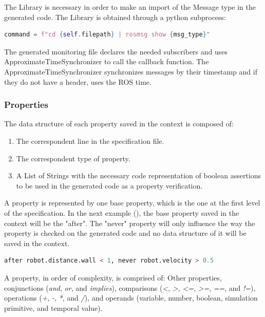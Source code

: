 The Library is necessary in order to make an import of the Message type in the generated code. The Library is obtained through a python subprocess:

\begin{lstlisting}[language=Python]
    command = f"cd {self.filepath} | rosmsg show {msg_type}"
\end{lstlisting}

The generated monitoring file declares the needed subscribers and uses ApproximateTimeSynchronizer to call the callback function. The ApproximateTimeSynchronizer synchronizes messages by their timestamp and if they do not have a header, uses the ROS time.


\subsubsection{Properties}
\label{sssec:compileProp}

The data structure of each property saved in the context is composed of:

\begin{enumerate}
    \item The correspondent line in the specification file.
    \item The correspondent type of property.
    \item A List of Strings with the necessary code representation of boolean assertions to be used in the generated code as a property verification.
\end{enumerate}


A property is represented by one base property, which is the one at the first level of the specification. In the next example (), the base property saved in the context will be the "after". The "never" property will only influence the way the property is checked on the generated code and no data structure of it will be saved in the context.

\begin{lstlisting}[language=Python]
    after robot.distance.wall < 1, never robot.velocity > 0.5
\end{lstlisting}\label{lstlisting:compileEx}

A property, in order of complexity, is comprised of: Other properties, conjunctions (\textit{and}, \textit{or}, and \textit{implies}), comparisons (\textit{<}, \textit{>}, \textit{<=}, \textit{>=}, \textit{==}, and \textit{!=}), operations (\textit{+}, \textit{-}, \textit{*}, and \textit{/}), and operands (variable, number, boolean, simulation primitive, and temporal value). 

